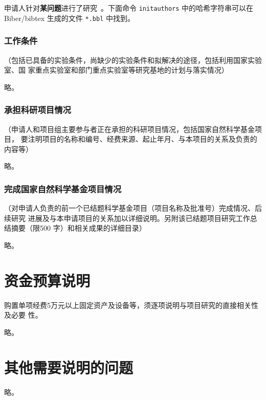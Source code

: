 \documentclass[subfig]{mynsfc}
\begin{document}
\begin{refsection}

  申请人针对\textbf{某问题}进行了研究~\cite{xia_saliency_2015}。下面命令
  \texttt{initauthors} 中的哈希字符串可以在Biber/bibtex 生成的文件
  \texttt{*.bbl} 中找到。

  \printbibliography[prefixnumbers=J,heading=cvtype,title={相关工作}]

\end{refsection}

\section{工作条件}
\label{sec:devices-laboratory}

\begin{hcomment}
  （包括已具备的实验条件，尚缺少的实验条件和拟解决的途径，包括利用国家实验室、国
  家重点实验室和部门重点实验室等研究基地的计划与落实情况）
\end{hcomment}

略。

\section{承担科研项目情况}
\label{sec:projects}

\begin{hcomment}
  （申请人和项目组主要参与者正在承担的科研项目情况，包括国家自然科学基金项目，
  要注明项目的名称和编号、经费来源、起止年月、与本项目的关系及负责的内容等）
\end{hcomment}

略。

\section{完成国家自然科学基金项目情况}
\label{sec:prev-nsfc}

\begin{hcomment}
  （对申请人负责的前一个已结题科学基金项目（项目名称及批准号）完成情况、后续研究
  进展及与本申请项目的关系加以详细说明。另附该已结题项目研究工作总结摘要（限500
  字）和相关成果的详细目录）
\end{hcomment}

略。

\part{资金预算说明}
\label{sec:finance}

\begin{hcomment}
  购置单项经费5万元以上固定资产及设备等，须逐项说明与项目研究的直接相关性及必要
  性。
\end{hcomment}

略。

\part{其他需要说明的问题}
\label{sec:others}

略。
\end{document}
